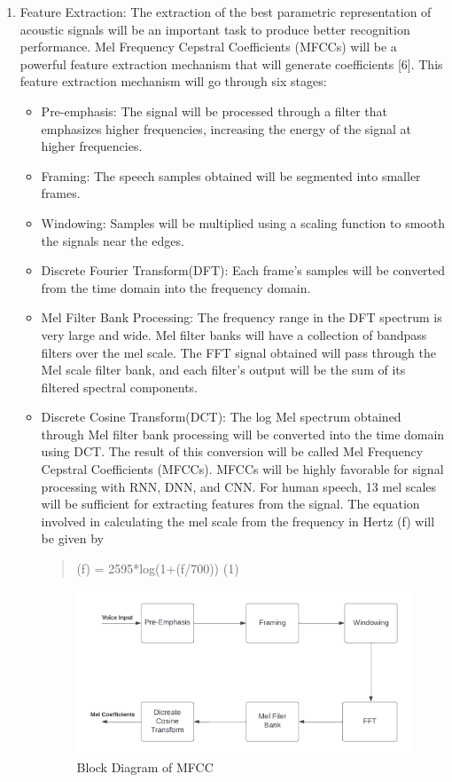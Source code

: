 \begin{enumerate}
	\item  Feature Extraction: The extraction of the best parametric representation of acoustic signals will be an important task to produce better recognition performance. Mel Frequency Cepstral Coefficients (MFCCs) will be a powerful feature extraction mechanism that will generate coefficients [6]. This feature extraction mechanism will go through six stages:
	\\
	\begin{itemize}
	
 \item Pre-emphasis: The signal will be processed through a filter that emphasizes higher frequencies, increasing the energy of the signal at higher frequencies.
\item Framing: The speech samples obtained will be segmented into smaller frames.
\item Windowing: Samples will be multiplied using a scaling function to smooth the signals near the edges.
\item Discrete Fourier Transform(DFT): Each frame's samples will be converted from the time domain into the frequency domain.
\item Mel Filter Bank Processing: The frequency range in the DFT spectrum is very large and wide. Mel filter banks will have a collection of bandpass filters over the mel scale. The FFT signal obtained will pass through the Mel scale filter bank, and each filter's output will be the sum of its filtered spectral components.
\item Discrete Cosine Transform(DCT):  The log Mel spectrum obtained through Mel filter bank processing will be converted into the time domain using DCT. The result of this conversion will be called Mel Frequency Cepstral Coefficients (MFCCs). MFCCs will be highly favorable for signal processing with RNN, DNN, and CNN. For human speech, 13 mel scales will be sufficient for extracting features from the signal. The equation involved in calculating the mel scale from the frequency in Hertz (f) will be given by
\begin{quote}
 \label{eq:mel}
                  \hspace{3cm}                              (f) = 2595*log(1+(f/700))  \hfill (1)
\end{quote}
\begin{figure}[h!]
    \includegraphics[scale=0.4]{images/BlockMFCC.png}
    \caption{Block Diagram of MFCC}
    \label{fig:my_label}
\end{figure}
\end{itemize}



\end{enumerate}
